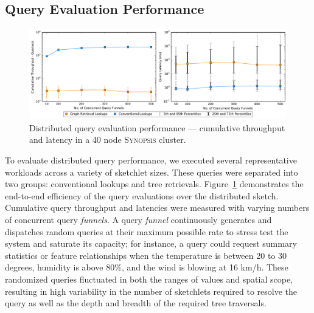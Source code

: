 \subsection{Query Evaluation Performance}
\begin{figure}[h!]
    \centerline{\includegraphics[width=\linewidth]{figures/query_benchmark_both.pdf}}
    \caption{Distributed query evaluation performance --- cumulative throughput and latency in a 40 node \textsc{Synopsis} cluster.}
    \label{fig:dist-query}
\end{figure}
To evaluate distributed query performance, we executed several representative workloads across a variety of sketchlet sizes. These queries were separated into two groups: conventional lookups and tree retrievals.  Figure~\ref{fig:dist-query} demonstrates the end-to-end efficiency of the query evaluations over the distributed sketch.
Cumulative query throughput and latencies were measured with varying numbers of concurrent query \emph{funnels}.
A query \emph{funnel} continuously generates and dispatches random queries at their maximum possible rate to stress test the system and saturate its capacity; for instance, a query could request summary statistics or feature relationships when the temperature is between 20 to 30 degrees, humidity is above 80\%, and the wind is blowing at 16 km/h.
These randomized queries fluctuated in both the ranges of values and spatial scope, resulting in high variability in the number of sketchlets required to resolve the query as well as the depth and breadth of the required tree traversals.




